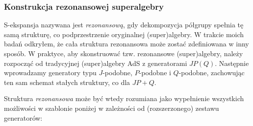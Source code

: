 \documentclass[12pt,a4paper]{article}
\begin{document}
\subsubsection{Konstrukcja rezonansowej superalgebry}\label{Construction}

S-ekspansja nazywana jest \textit{rezonansową}, gdy dekompozycja półgrupy spełnia tę samą strukturę, co podprzestrzenie oryginalnej (super)algebry. W trakcie moich badań odkryłem, że cała struktura rezonansowa może zostać zdefiniowana w inny sposób. W praktyce, aby skonstruować tzw. rezonansowe (super)algebry, należy rozpocząć od tradycyjnej (super)algebry AdS z generatorami $JP(Q)$. Następnie wprowadzamy generatory typu $J$-podobne, $P$-podobne i $Q$-podobne, zachowując ten sam schemat stałych struktury, co dla $JP+Q$.

Struktura \textit{rezonansowa} może być wtedy rozumiana jako wypełnienie wszystkich możliwości w szablonie poniżej w zależności od (rozszerzonego) zestawu generatorów:
\end{document}
